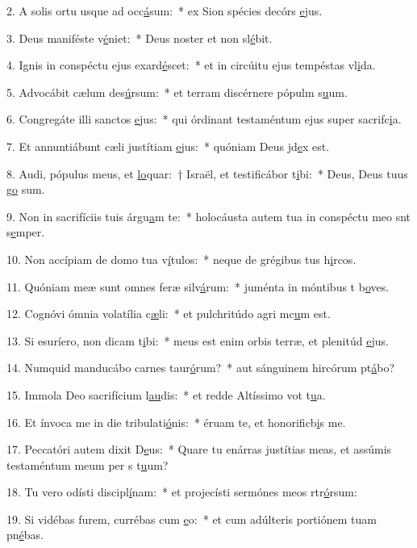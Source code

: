 2. A solis ortu usque ad occ\uline{á}sum:~* ex Sion spécies decórs \uline{e}jus.\par 
3. Deus maniféste v\uline{é}niet:~* Deus noster et non sl\uline{é}bit.\par 
4. Ignis in conspéctu ejus exard\uline{é}scet:~* et in circúitu ejus tempéstas vl\uline{i}da.\par 
5. Advocábit cælum des\uline{ú}rsum:~* et terram discérnere pópulm s\uline{u}um.\par 
6. Congregáte illi sanctos \uline{e}jus:~* qui órdinant testaméntum ejus super sacrifc\uline{i}a.\par 
7. Et annuntiábunt cæli justítiam \uline{e}jus:~* quóniam Deus jd\uline{e}x est.\par 
8. Audi, pópulus meus, et \uline{lo}quar:~† Israël, et testificábor t\uline{i}bi:~* Deus, Deus tuus g\uline{o} sum.\par 
9. Non in sacrifíciis tuis árgu\uline{a}m te:~* holocáusta autem tua in conspéctu meo snt s\uline{e}mper.\par 
10. Non accípiam de domo tua v\uline{í}tulos:~* neque de grégibus tus h\uline{i}rcos.\par 
11. Quóniam meæ sunt omnes feræ silv\uline{á}rum:~* juménta in móntibus t b\uline{o}ves.\par 
12. Cognóvi ómnia volatília c\uline{æ}li:~* et pulchritúdo agri mc\uline{u}m est.\par 
13. Si esuríero, non dicam t\uline{i}bi:~* meus est enim orbis terræ, et plenitúd \uline{e}jus.\par 
14. Numquid manducábo carnes taur\uline{ó}rum?~* aut sánguinem hircórum pt\uline{á}bo?\par 
15. Immola Deo sacrifícium l\uline{au}dis:~* et redde Altíssimo vot t\uline{u}a.\par 
16. Et ínvoca me in die tribulati\uline{ó}nis:~* éruam te, et honorificb\uline{i}s me.\par 
17. Peccatóri autem dixit D\uline{e}us:~* Quare tu enárras justítias meas, et assúmis testaméntum meum per s t\uline{u}um?\par 
18. Tu vero odísti discipl\uline{í}nam:~* et projecísti sermónes meos rtr\uline{ó}rsum:\par 
19. Si vidébas furem, currébas cum \uline{e}o:~* et cum adúlteris portiónem tuam pn\uline{é}bas.\par 
